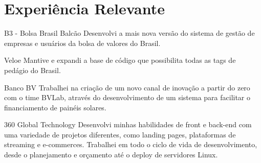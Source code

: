 \section{Experiência Relevante}


\begin{experience}{B3 - Bolsa Brasil Balcão}{
}
Desenvolvi a mais nova versão do sistema de gestão de empresas e usuários da bolsa de valores do Brasil.

\end{experience}
\begin{experience}{Veloe}{
}
Mantive e expandi a base de código que possibilita todas as tags de pedágio do Brasil.

\end{experience}
\begin{experience}{Banco BV}{
}
Trabalhei na criação de um novo canal de inovação a partir do zero com o time BVLab, através do desenvolvimento de um sistema para facilitar o financiamento de painéis solares.

\end{experience}
\begin{experience}[last]{360 Global Technology}{
}
Desenvolvi minhas habilidades de front e back-end com uma variedade de projetos diferentes, como landing pages, plataformas de streaming e e-commerces. Trabalhei em todo o ciclo de vida de desenvolvimento, desde o planejamento e orçamento até o deploy de servidores Linux.

\end{experience}
